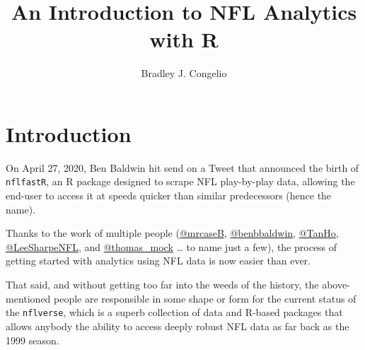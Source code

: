 \documentclass[
  letterpaper,
]{krantz}
\title{An Introduction to NFL Analytics with R}
\author{Bradley J. Congelio}
\date{}
\renewcommand*\contentsname{Table of contents}
\newcommand\contentsname{Table of contents}
\begin{document}
\maketitle
\ifdefined\Shaded\renewenvironment{Shaded}{\begin{tcolorbox}[borderline west={3pt}{0pt}{shadecolor}, frame hidden, boxrule=0pt, interior hidden, breakable, sharp corners, enhanced]}{\end{tcolorbox}}\fi

\renewcommand*\contentsname{Table of contents}
{
\hypersetup{linkcolor=}
\setcounter{tocdepth}{2}
\tableofcontents
}

\hypertarget{introduction}{%
\chapter{Introduction}\label{introduction}}

On April 27, 2020, Ben Baldwin hit send on a Tweet that announced the
birth of \texttt{nflfastR}, an R package designed to scrape NFL
play-by-play data, allowing the end-user to access it at speeds quicker
than similar predecessors (hence the name).

Thanks to the work of multiple people
(\href{https://twitter.com/mrcaseb}{@mrcaseB},
\href{https://twitter.com/benbbaldwin}{@benbbaldwin},
\href{https://twitter.com/_TanHo}{@TanHo},
\href{https://twitter.com/LeeSharpeNFL}{@LeeSharpeNFL}, and
\href{https://twitter.com/thomas_mock}{@thomas\_mock} \ldots{} to name
just a few), the process of getting started with analytics using NFL
data is now easier than ever.

That said, and without getting too far into the weeds of the history,
the above-mentioned people are responsible in some shape or form for the
current status of the \texttt{nflverse}, which is a superb collection of
data and R-based packages that allows anybody the ability to access
deeply robust NFL data as far back as the 1999 season.
\end{document}
